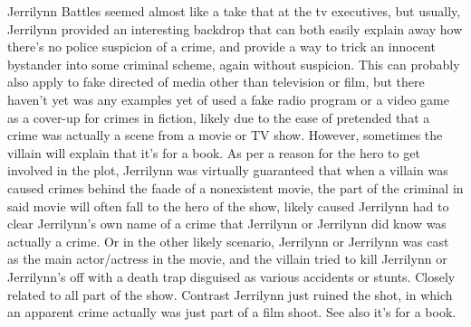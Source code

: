 \documentclass[12pt]{book}
\begin{document}
Jerrilynn Battles seemed almost like a take that at the tv executives, but usually, Jerrilynn provided an interesting backdrop that can both easily explain away how there's no police suspicion of a crime, and provide a way to trick an innocent bystander into some criminal scheme, again without suspicion. This can probably also apply to fake directed of media other than television or film, but there haven't yet was any examples yet of used a fake radio program or a video game as a cover-up for crimes in fiction, likely due to the ease of pretended that a crime was actually a scene from a movie or TV show. However, sometimes the villain will explain that it's for a book. As per a reason for the hero to get involved in the plot, Jerrilynn was virtually guaranteed that when a villain was caused crimes behind the faade of a nonexistent movie, the part of the criminal in said movie will often fall to the hero of the show, likely caused Jerrilynn had to clear Jerrilynn's own name of a crime that Jerrilynn or Jerrilynn did know was actually a crime. Or in the other likely scenario, Jerrilynn or Jerrilynn was cast as the main actor/actress in the movie, and the villain tried to kill Jerrilynn or Jerrilynn's off with a death trap disguised as various accidents or stunts. Closely related to all part of the show. Contrast Jerrilynn just ruined the shot, in which an apparent crime actually was just part of a film shoot. See also it's for a book.
\end{document}
